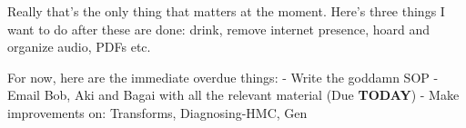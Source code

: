 \noindent {}

Really that's the only thing that matters at the moment. Here's three things I want to do after these are done: drink, remove internet presence, hoard and organize audio, PDFs etc.

For now, here are the immediate overdue things:
- Write the goddamn SOP
- Email Bob, Aki and Bagai with all the relevant material (Due \textbf{TODAY})
- Make improvements on: Transforms, Diagnosing-HMC, Gen